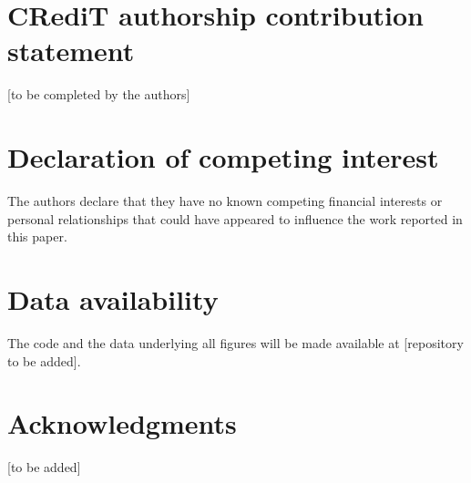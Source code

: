 \hypertarget{credit-authorship-contribution-statement}{%
\section*{CRediT authorship contribution statement}\label{credit-authorship-contribution-statement}}

{[}to be completed by the authors{]}

\hypertarget{declaration-of-competing-interest}{%
\section*{Declaration of competing interest}\label{declaration-of-competing-interest}}

The authors declare that they have no known competing financial interests or personal relationships that could have appeared to influence the work reported in this paper.

\hypertarget{data-availability}{%
\section*{Data availability}\label{data-availability}}

The code and the data underlying all figures will be made available at {[}repository to be added{]}.

\hypertarget{acknowledgments}{%
\section*{Acknowledgments}\label{acknowledgments}}

{[}to be added{]}
